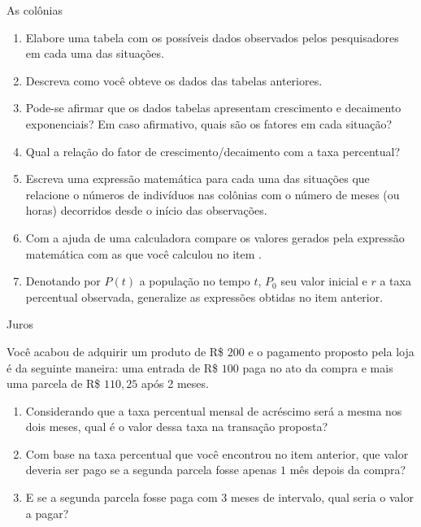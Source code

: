 \begin{task}{As colônias}
\begin{enumerate}
\item{}
Elabore uma tabela com os possíveis dados observados pelos pesquisadores em cada uma das situações.
\item{}
Descreva como você obteve os dados das tabelas anteriores.
\item{}
Pode-se afirmar que os dados tabelas apresentam crescimento e decaimento exponenciais? Em caso afirmativo, quais são os fatores em cada situação?
\item{}
Qual a relação do fator de crescimento/decaimento com a taxa percentual?
\item{}
Escreva uma expressão matemática para cada uma das situações que relacione o números de indivíduos nas colônias com o número de meses (ou horas) decorridos desde o início das observações.
\item{}
Com a ajuda de uma calculadora compare os valores gerados pela expressão matemática com as que você calculou no item .
\item{}
Denotando por $P(t)$ a população no tempo $t$, $P_0$ seu valor inicial e $r$ a taxa percentual observada, generalize as expressões obtidas no item anterior.
\end{enumerate}

\end{task}





\begin{task}{Juros}


Você acabou de adquirir um produto de R\$ $200$ e o pagamento proposto pela loja é da seguinte maneira: uma entrada de R\$ $100$ paga no ato da compra e mais uma parcela de  R\$ $110{,}25$ após 2 meses.

\begin{enumerate}

\item{}
Considerando que a taxa percentual mensal de acréscimo será a mesma nos dois meses, qual é o valor dessa taxa na transação proposta?

\item{}
Com base na taxa percentual que você encontrou no item anterior, que valor deveria ser pago se a segunda parcela fosse apenas $1$ mês depois da compra?

\item{}
E se a segunda parcela fosse paga com $3$ meses de intervalo, qual seria o valor a pagar? 

\end{enumerate}

\end{task}

